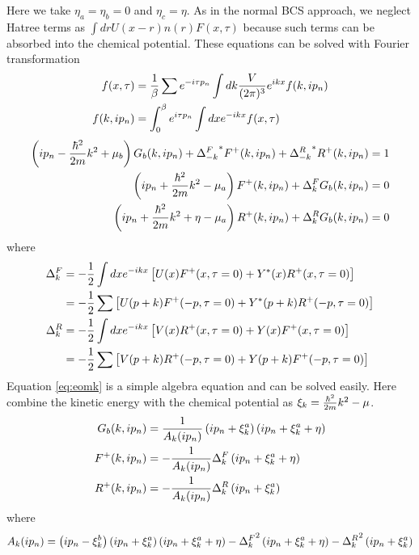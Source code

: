 Here we take $\eta_a=\eta_b=0$ and $\eta_c=\eta$.  As in the normal BCS approach, we neglect Hatree terms as $\int{dr}U(x-r)n(r)F(x,\tau)$ because such terms can be absorbed into the chemical potential.  These equations can be solved with Fourier transformation
\begin{align*}
f(x,\tau)&=\frac{1}{\beta}\sum{}e^{-i\tau{p_n}}\int{dk}\frac{V}{(2\pi)^3}e^{ikx}f(k,ip_n)\\
f(k,ip_n)&=\int^\beta_0e^{i\tau{p_n}}\int{dx}e^{-ikx}f(x,\tau)	
\end{align*}
\begin{equation}\label{eq:eomk}
\begin{split}
\left(ip_n-\frac{\hbar^2}{2m}{k^2}+\mu_b\right)G_b(k,ip_n)+{\Delta^F_{-k}}^*F^+(k,ip_n)+{\Delta^R_{-k}}^*R^+(k,ip_n)&=1\\
\left(ip_n+\frac{\hbar^2}{2m}{k^2}-\mu_a\right)F^+(k,ip_n)+\Delta^F_{k}G_b(k,ip_n)&=0\\
\left(ip_n+\frac{\hbar^2}{2m}{k^2}+\eta-\mu_a\right)R^+(k,ip_n)+\Delta^R_{k}G_b(k,ip_n)&=0
\end{split}
\end{equation} 
where 
\begin{equation}\begin{split}\label{eq:gap}
\Delta^F_k&=-\frac{1}{2}\int{dx}e^{-ikx}\left[U(x)F^+(x,\tau=0)+Y^*(x)R^+(x,\tau=0)\right]\\
	&=-\frac{1}{2}\sum\left[U(p+k)F^+(-p,\tau=0)+Y^*(p+k)R^+(-p,\tau=0)\right]\\
\Delta^R_k&=-\frac{1}{2}\int{dx}e^{-ikx}\left[V(x)R^+(x,\tau=0)+Y(x)F^+(x,\tau=0)\right]\\
	&=-\frac{1}{2}\sum\left[V(p+k)R^+(-p,\tau=0)+Y(p+k)F^+(-p,\tau=0)\right]
\end{split}\end{equation}
Equation \eqref{eq:eomk} is a simple algebra equation and can be solved easily.  Here combine the kinetic energy with the chemical potential as $\xi_k=\frac{\hbar^2}{2m}{k^2}-\mu$.
\begin{equation}\begin{split}
G_b(k,ip_n)&=\frac{1}{A_k(ip_n)}\left(ip_n+\xi^a_k\right)\left(ip_n+\xi^a_k+\eta\right)\\
F^+(k,ip_n)&=-\frac{1}{A_k(ip_n)}\Delta^F_k\left(ip_n+\xi^a_k+\eta\right)\\
R^+(k,ip_n)&=-\frac{1}{A_k(ip_n)}\Delta^R_k\left(ip_n+\xi^a_k\right)
\end{split}\end{equation}
where 
\begin{equation}\label{eq:A}
A_k(ip_n)=\left(ip_n-\xi^b_k\right)\left(ip_n+\xi^a_k\right)\left(ip_n+\xi^a_k+\eta\right)-{\Delta^F_k}^2\left(ip_n+\xi^a_k+\eta\right)-{\Delta^R_k}^2\left(ip_n+\xi^a_k\right)
\end{equation}
